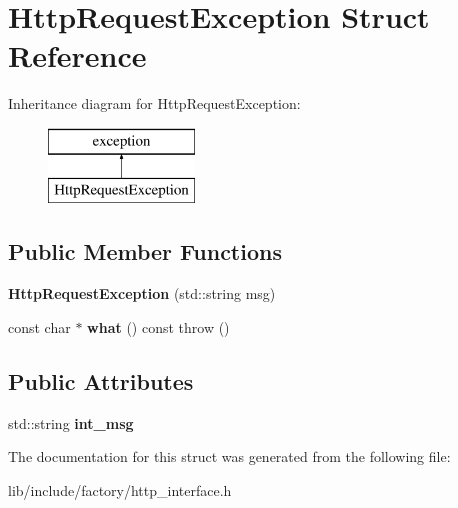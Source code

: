 \hypertarget{structHttpRequestException}{\section{Http\-Request\-Exception Struct Reference}
\label{structHttpRequestException}
}
Inheritance diagram for Http\-Request\-Exception\-:\begin{figure}[H]
\begin{center}
\leavevmode
\includegraphics[height=2.000000cm]{structHttpRequestException}
\end{center}
\end{figure}
\subsection*{Public Member Functions}
\begin{DoxyCompactItemize}
\item 
\hypertarget{structHttpRequestException_a8470fe285f8e7f0939b5068546967764}{{\bfseries Http\-Request\-Exception} (std\-::string msg)}\label{structHttpRequestException_a8470fe285f8e7f0939b5068546967764}

\item 
\hypertarget{structHttpRequestException_acf07a2f7382157a27c0c5d2cedb2f2e6}{const char $\ast$ {\bfseries what} () const   throw ()}\label{structHttpRequestException_acf07a2f7382157a27c0c5d2cedb2f2e6}

\end{DoxyCompactItemize}
\subsection*{Public Attributes}
\begin{DoxyCompactItemize}
\item 
\hypertarget{structHttpRequestException_a52a64d4648b543b81050bec3fb039e5f}{std\-::string {\bfseries int\-\_\-msg}}\label{structHttpRequestException_a52a64d4648b543b81050bec3fb039e5f}

\end{DoxyCompactItemize}


The documentation for this struct was generated from the following file\-:\begin{DoxyCompactItemize}
\item 
lib/include/factory/http\-\_\-interface.\-h\end{DoxyCompactItemize}
